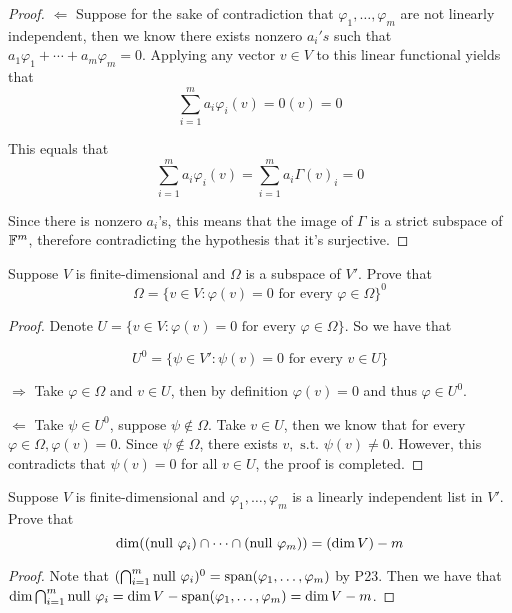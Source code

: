 \documentclass{extarticle}
\begin{document}
\begin{proof}
\(\Leftarrow\) Suppose for the sake of contradiction that \(\varphi_1, \ldots, \varphi_m\) are not linearly 
independent, then we know there exists nonzero \(a_i's\) such that \(a_1 \varphi_1 + \cdots + a_m 
\varphi_m = 0\). Applying any vector \(v \in V\) to this linear functional yields that 
\[\sum_{i=1}^{m}a_i \varphi_i (v) = 0(v) = 0\]

This equals that 
\[\sum_{i=1}^{m}a_i \varphi_i (v) = \sum_{i=1}^{m}a_i \Gamma(v)_i = 0\]

Since there is nonzero \(a_i\)'s, this means that the image of \(\Gamma\) is a strict subspace 
of \(\mathbb{F}^m\), therefore contradicting the hypothesis that it's surjective.


\end{proof}

\begin{problem}{26}
    Suppose \(V\) is finite-dimensional and \(\Omega\) is a subspace of \(V'\). Prove that 
    \[\Omega = \{v \in V \colon \varphi(v) = 0 \text{ for every } \varphi \in \Omega\}^0\]
\end{problem}

\begin{proof}
Denote \(U = \{v \in V \colon \varphi(v) = 0 \text{ for every } \varphi \in \Omega\}\). 
So we have that 

\[U^0 = \{\psi\in V' \colon \psi(v) = 0 \text{ for every } v \in U\}\]


\(\Rightarrow\) Take \(\varphi \in \Omega\) and \(v \in U\), then by definition \(\varphi(v) = 0\)
and thus \(\varphi \in U^0\). 

\(\Leftarrow\) Take \(\psi \in U^0\), suppose \(\psi\notin \Omega\). Take \(v \in U\), then we know 
that for every \(\varphi \in \Omega, \varphi(v) = 0\). Since \(\psi \notin \Omega\), there 
exists \(v, \text{ s.t. }\psi(v) \neq 0\). However, this contradicts that \(\psi(v) = 0\) for all 
\(v \in U\), the proof is completed.  
\end{proof}

\begin{problem}{28}
    Suppose \(V\) is finite-dimensional and \(\varphi_1, \ldots, \varphi_m\) is a linearly independent 
    list in \(V'\). Prove that 
    \[\dim((\text{null } \varphi_i) \cap \cdots \cap (\text{null } \varphi_m)) = (\dim V) - m\]
\end{problem}

\begin{proof}
Note that \((\bigcap_{i=1}^m \text{null } \varphi_i)^0 = \text{span}(\varphi_1, \ldots, \varphi_m)\) by P23. Then 
we have that \(\dim \bigcap_{i=1}^m \text{null } \varphi_i = \dim V - \text{span}(\varphi_1, \ldots, \varphi_m)  
= \dim V - m\). 
\end{proof}
\end{document}
